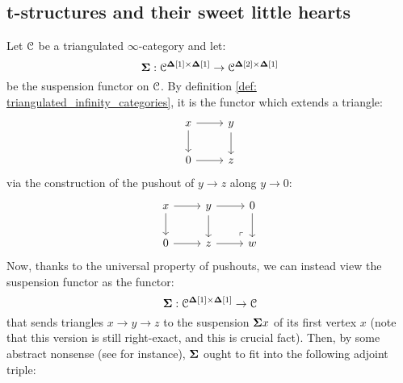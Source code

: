         \subsection{t-structures and their sweet little hearts}
            \begin{remark} \label{remark: suspensions_and_loops}
                Let $\mathcal{C}$ be a triangulated $\infty$-category and let:
                    $$\suspension: \C^{\simp[1] \x \simp[1]} \to \C^{\simp[2] \x \simp[1]}$$
                be the suspension functor on $\mathcal{C}$. By definition \ref{def: triangulated_infinity_categories}, it is the functor which extends a triangle:
                    $$
                        \begin{tikzcd}
                            x & y \\
                            0 & z
                            \arrow[from=1-1, to=2-1]
                            \arrow[from=1-1, to=1-2]
                            \arrow[from=1-2, to=2-2]
                            \arrow[from=2-1, to=2-2]
                        \end{tikzcd}
                    $$
                via the construction of the pushout of $y \to z$ along $y \to 0$:
                    $$
                        \begin{tikzcd}
                            x & y & 0 \\
                            0 & z & w
                            \arrow[from=1-1, to=2-1]
                            \arrow[from=1-1, to=1-2]
                            \arrow[from=1-2, to=2-2]
                            \arrow[from=2-1, to=2-2]
                            \arrow[from=1-2, to=1-3]
                            \arrow[from=1-3, to=2-3]
                            \arrow[from=2-2, to=2-3]
                            \arrow["\lrcorner"{anchor=center, pos=0.125, rotate=180}, draw=none, from=2-3, to=1-2]
                        \end{tikzcd}
                    $$
                Now, thanks to the universal property of pushouts, we can instead view the suspension functor as the functor:
                    $$\suspension: \C^{\simp[1] \x \simp[1]} \to \C$$
                that sends triangles $x \to y \to z$ to the suspension $\mathbf{\Sigma} x$ of its first vertex $x$ (note that this version is still right-exact, and this is crucial fact). Then, by some abstract nonsense (see \cite[Section 3]{nlab:infinity-1-limit} for instance), $\mathbf{\Sigma}$ ought to fit into the following adjoint triple:

\end{remark}
